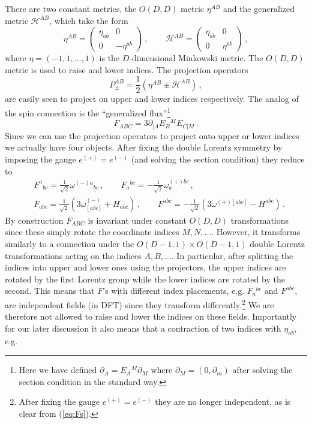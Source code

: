 \documentclass[a4paper,11pt]{article}
\begin{document}
There are two constant metrics, the $O(D,D)$ metric $\eta^{AB}$ and the generalized metric $\mathcal H^{AB}$, which take the form
\begin{equation}
\eta^{AB}=
\left(
\begin{array}{cc}
	\eta_{ab} & 0\\
	0 & -\eta^{ab}
\end{array}
\right)\,,\qquad
\mathcal H^{AB}=
\left(
\begin{array}{cc}
	\eta_{ab} & 0\\
	0 & \eta^{ab}
\end{array}
\right)\,,
\label{eq:eta}
\end{equation}
where $\eta=(-1,1,\ldots,1)$ is the $D$-dimensional Minkowski metric. The $O(D,D)$ metric is used to raise and lower indices. The projection operators
\begin{equation}
P_\pm^{AB}=\frac12\left(\eta^{AB}\pm\mathcal H^{AB}\right)\,,
\label{eq:Ppm}
\end{equation}
are easily seen to project on upper and lower indices respectively. The analog of the spin connection is the ``generalized flux''\footnote{Here we have defined $\partial_A=E_A{}^M\partial_M$ where $\partial_M=(0,\partial_m)$ after solving the section condition in the standard way.}
\begin{equation}
F_{ABC}=3\partial_{[A}E_B{}^ME_{C]M}\,.
\label{eq:fluxes}
\end{equation}
Since we can use the projection operators to project onto upper or lower indices we actually have four objects. After fixing the double Lorentz symmetry by imposing the gauge $e^{(+)}=e^{(-)}$ (and solving the section condition) they reduce to
\begin{align}
&F^a{}_{bc}=\frac{1}{\sqrt2}\omega^{(-)a}{}_{bc}\,,\qquad 
F_a{}^{bc}=-\frac{1}{\sqrt2}\omega_a^{(+)bc}\,,
\nonumber\\
&F_{abc}=\frac{1}{\sqrt2}(3\omega^{(-)}_{[abc]}+H_{abc})\,,\qquad 
F^{abc}=-\frac{1}{\sqrt2}(3\omega^{(+)[abc]}-H^{abc})\,.
\label{eq:Fs}
\end{align}
By construction $F_{ABC}$ is invariant under constant $O(D,D)$ transformations since these simply rotate the coordinate indices $M,N,\ldots$. However, it transforms similarly to a connection under the $O(D-1,1)\times O(D-1,1)$ double Lorentz transformations acting on the indices $A,B,\ldots$. In particular, after splitting the indices into upper and lower ones using the projectors, the upper indices are rotated by the first Lorentz group while the lower indices are rotated by the second. This means that $F$'s with different index placements, e.g. $F_a{}^{bc}$ and $F^{abc}$, are independent fields (in DFT) since they transform differently.\footnote{After fixing the gauge $e^{(+)}=e^{(-)}$ they are no longer independent, as is clear from (\ref{eq:Fs}).} We are therefore not allowed to raise and lower the indices on these fields. Importantly for our later discussion it also means that a contraction of two indices with $\eta_{ab}$, e.g.
\end{document}
